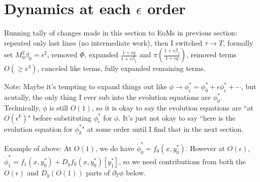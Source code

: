 \documentclass{article}
\newcommand{\para}{\parallel}
\newcommand{\ep}{\epsilon}
\newcommand{\p}{\partial}
\newcommand{\fr}{\frac{1+\ep q}{1+\ep\beta_\para}}
\newcommand{\frinv}{\frac{1+\ep\beta_\para}{1+\ep q}}
\newcommand{\pth} [1] {\left( #1 \right) }
\begin{document}
\section{Dynamics at each $\ep$ order} \label
{dyanmicsateachorder}
Running tally of changes made in this section to EoMs in previous section: repeated only last lines (no intermediate work), then I switched $\tau\to T$, formally set $M_0^2\beta_0=\ep^2$, removed $\Phi$, expanded $\fr$ and $\pi\pth{\frinv}$, removed terms $O\pth{\geq\ep^3}$, canceled like terms, fully expanded remaining terms. 

Note: Maybe it's tempting to expand things out like $\phi\to \phi^*_\ep = \phi^*_0 + \ep\phi^*_\ep+\cdots$, but acutally, the only thing I ever sub into the evolution equations are $\phi^*_0$. Technically, $\phi$ is still $O(1)$, so it is okay to say the evolution equations are ``at $O(\ep^k)$" before substituting $\phi^*_\ep$ for $\phi$. It's just not okay to say ``here is the evolution equation for $\phi^*_k$" at some order until I find that in the next section. 

Example of above: At $O(1)$, we do have $\dot{\phi}^*_0 = f_0(x,y_0^*)$. However at $O(\ep)$, $\dot{\phi}^*_1 = f_1(x,y^*_0) + D_yf_0(x,y_0^*)[y^*_1]$, so we need contributions from both the $O(\ep)$ and $D_y(O(1))$ parts of $\p_T\phi$ below. 
\end{document}
